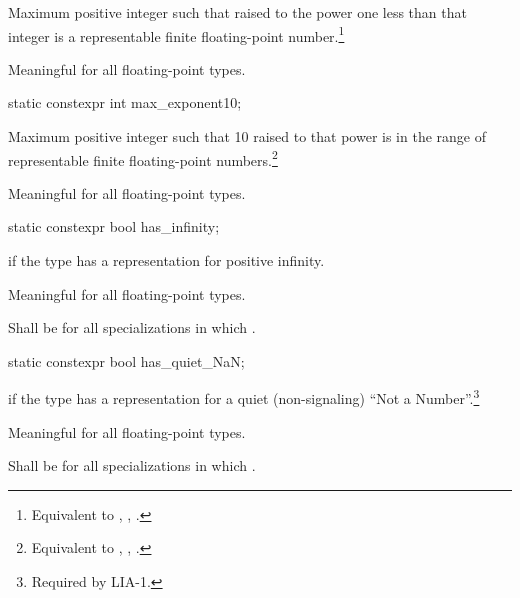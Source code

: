 \begin{itemdescr}
\pnum
Maximum positive integer such that
raised to the power one less than that integer is a representable finite
floating-point number.\footnote{Equivalent to ,
, .}

\pnum
Meaningful for all floating-point types.
\end{itemdescr}

%
\begin{itemdecl}
static constexpr int  max_exponent10;
\end{itemdecl}

\begin{itemdescr}
\pnum
Maximum positive integer such that 10 raised to that power is in the
range of representable finite floating-point numbers.\footnote{Equivalent to
, , .}

\pnum
Meaningful for all floating-point types.
\end{itemdescr}

%
\begin{itemdecl}
static constexpr bool has_infinity;
\end{itemdecl}

\begin{itemdescr}
\pnum
{} if the type has a representation for positive infinity.

\pnum
Meaningful for all floating-point types.

\pnum
Shall be
for all specializations in which
.
\end{itemdescr}

%
\begin{itemdecl}
static constexpr bool has_quiet_NaN;
\end{itemdecl}

\begin{itemdescr}
\pnum
{} if the type has a representation for a quiet (non-signaling) ``Not a
Number''.\footnote{Required by LIA-1.}

\pnum
Meaningful for all floating-point types.

\pnum
Shall be
for all specializations in which
.
\end{itemdescr}

